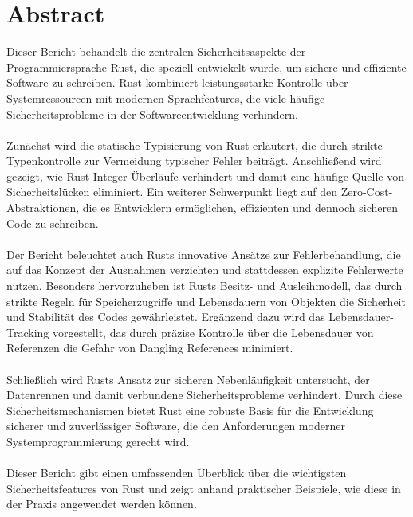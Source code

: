 \section*{Abstract}
\label{sec:abstract}

Dieser Bericht behandelt die zentralen Sicherheitsaspekte der Programmiersprache Rust, die speziell entwickelt wurde, um sichere und effiziente Software zu schreiben. 
Rust kombiniert leistungsstarke Kontrolle über Systemressourcen mit modernen Sprachfeatures, die viele häufige Sicherheitsprobleme in der Softwareentwicklung verhindern.\\
\\
Zunächst wird die statische Typisierung von Rust erläutert, die durch strikte Typenkontrolle zur Vermeidung typischer Fehler beiträgt. 
Anschließend wird gezeigt, wie Rust Integer-Überläufe verhindert und damit eine häufige Quelle von Sicherheitslücken eliminiert. 
Ein weiterer Schwerpunkt liegt auf den Zero-Cost-Abstraktionen, die es Entwicklern ermöglichen, effizienten und dennoch sicheren Code zu schreiben.\\
\\
Der Bericht beleuchtet auch Rusts innovative Ansätze zur Fehlerbehandlung, die auf das Konzept der Ausnahmen verzichten und stattdessen explizite Fehlerwerte nutzen. 
Besonders hervorzuheben ist Rusts Besitz- und Ausleihmodell, das durch strikte Regeln für Speicherzugriffe und Lebensdauern von Objekten die Sicherheit und Stabilität des Codes gewährleistet. 
Ergänzend dazu wird das Lebensdauer-Tracking vorgestellt, das durch präzise Kontrolle über die Lebensdauer von Referenzen die Gefahr von Dangling References minimiert.\\
\\
Schließlich wird Rusts Ansatz zur sicheren Nebenläufigkeit untersucht, der Datenrennen und damit verbundene Sicherheitsprobleme verhindert. 
Durch diese Sicherheitsmechanismen bietet Rust eine robuste Basis für die Entwicklung sicherer und zuverlässiger Software, die den Anforderungen moderner Systemprogrammierung gerecht wird.\\
\\
Dieser Bericht gibt einen umfassenden Überblick über die wichtigsten Sicherheitsfeatures von Rust und zeigt anhand praktischer Beispiele, wie diese in der Praxis angewendet werden können.
